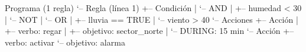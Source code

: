 Programa (1 regla)
`-- Regla (línea 1)
    +-- Condición
    |   `-- AND
    |       +-- humedad < 30
    |       `-- NOT
    |           `-- OR
    |               +-- lluvia == TRUE
    |               `-- viento > 40
    `-- Acciones
        +-- Acción
        |   +-- verbo: regar
        |   +-- objetivo: sector_norte
        |   `-- DURING: 15 min
        `-- Acción
            +-- verbo: activar
            `-- objetivo: alarma
